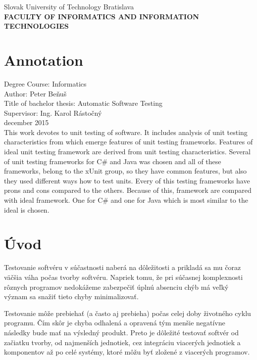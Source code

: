 \documentclass[11pt,twoside,slovak,a4paper]{article}
\begin{document}
	\begin{titlepage}
		\begin{center}
			\large 		Slovak University of Technology Bratislava\\
			\textbf{\MakeUppercase{Faculty of Informatics and Information Technologies}}\\
			\hrulefill
		\end{center}
		\section*{Annotation}
		Degree Course: Informatics\\
		Author: Peter Beňuš \\
		Title of bachelor thesis: Automatic Software Testing\\
		Supervisor: Ing. Karol Rástočný \\
		december 2015 \\
		This work devotes to unit testing of software. It includes analysis of unit testing characteristics from which emerge features of unit testing frameworks. Features of ideal unit testing framework are derived from unit testing characteristics. Several of unit testing frameworks for C\# and Java was chosen and  all of these frameworks, belong to the xUnit group, so they have common features, but also they used different ways how to test units. Every of this testing frameworks have prons and cons compared to the others. Because of this, framework are compared with ideal framework. One for C\# and one for Java which is most similar to the ideal is chosen.
		
		
	\end{titlepage}
	
	\begin{titlepage}
		\tableofcontents
	\end{titlepage}
	
	
	\pagestyle{fancy}
	\fancyhf{}
	\fancyhead[RE,LO]{\thechapter \leftmark}
	\fancyfoot[CE,CO]{\thepage}
	\headheight 14pt
	
	\section{Úvod}
	Testovanie softvéru v súčastnosti naberá na dôležitosti a prikladá sa mu čoraz väčšia váha počas tvorby softvéru. Napriek tomu, že pri súčasnej komplexnosti rôznych programov nedokážeme zabezpečiť úplnú absenciu chýb má veľký význam sa snažiť tieto chyby minimalizovať.
	
	Testovanie môže prebiehať (a často aj prebieha) počas celej doby životného cyklu programu. Čím skôr je chyba odhalená a opravená tým menšie negatívne následky bude mať na výsledný produkt. Preto je dôležité testovať softvér od začiatku tvorby, od najmenších jednotiek, cez integráciu viacerých jednotiek a komponentov až po celé systémy, ktoré môžu byť zložené z viacerých programov.
	
\end{document}
